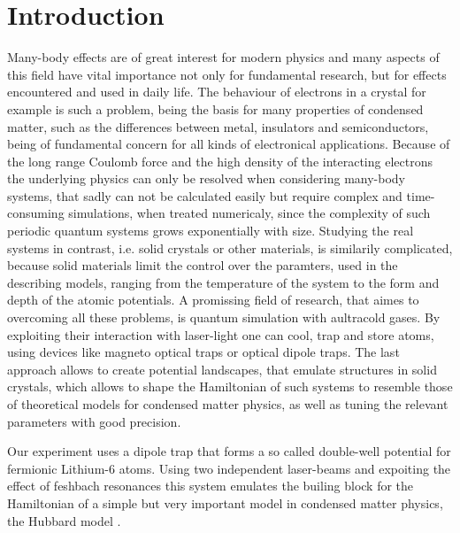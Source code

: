 \chapter{Introduction}

Many-body effects are of great interest for modern physics and many aspects of this field have vital importance not only for fundamental research, but for effects encountered and used in daily life. The behaviour of electrons in a crystal for example is such a problem, being the basis for many properties of condensed matter, such as the differences between metal, insulators and semiconductors, being of fundamental concern for all kinds of electronical applications. Because of the long range Coulomb force and the high density of the interacting electrons the underlying physics can only be resolved when considering many-body systems, that sadly can not be calculated easily but require complex and time-consuming simulations, when treated numericaly, since the complexity of such periodic quantum systems grows exponentially with size\cite{feynman}. Studying the real systems in contrast, i.e. solid crystals or other materials, is similarily complicated, because solid materials limit the control over the paramters, used in the describing models, ranging from the temperature of the system to the form and depth of the atomic potentials. A promissing field of research, that aimes to overcoming all these problems, is quantum simulation with aultracold gases. By exploiting their interaction with laser-light one can cool, trap and store atoms, using devices like magneto optical traps or optical dipole traps\cite{metcalf}. The last approach allows to create potential landscapes, that emulate structures in solid crystals, which allows to shape the Hamiltonian of such systems to resemble those of theoretical models for condensed matter physics, as well as tuning the relevant parameters with good precision\cite{bloch}. 

Our experiment uses a dipole trap that forms a so called double-well potential for fermionic Lithium-6 atoms. Using two independent laser-beams and expoiting the effect of feshbach resonances this system emulates the builing block for the Hamiltonian of a simple but very important model in condensed matter physics, the Hubbard model \cite{doublewell}.

